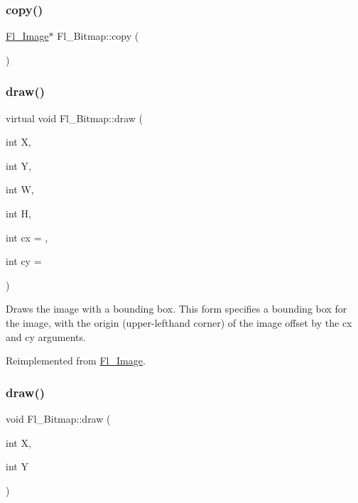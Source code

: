 \subsubsection{\texorpdfstring{copy()}{copy()}\hspace{0.1cm}{\footnotesize\ttfamily [2/2]}}
{\footnotesize\ttfamily \hyperlink{class_fl___image}{Fl\+\_\+\+Image}$\ast$ Fl\+\_\+\+Bitmap\+::copy (\begin{DoxyParamCaption}{ }\end{DoxyParamCaption})\hspace{0.3cm}{\ttfamily [inline]}}

\mbox{\label{class_fl___bitmap_abd03a34e84704ae410bd366626c0a6ef}} 
\subsubsection{\texorpdfstring{draw()}{draw()}\hspace{0.1cm}{\footnotesize\ttfamily [1/2]}}
{\footnotesize\ttfamily virtual void Fl\+\_\+\+Bitmap\+::draw (\begin{DoxyParamCaption}\item[{int}]{X,  }\item[{int}]{Y,  }\item[{int}]{W,  }\item[{int}]{H,  }\item[{int}]{cx = {},  }\item[{int}]{cy = {} }\end{DoxyParamCaption})\hspace{0.3cm}{\ttfamily [virtual]}}

Draws the image with a bounding box. This form specifies a bounding box for the image, with the origin (upper-\/lefthand corner) of the image offset by the cx and cy arguments. 

Reimplemented from \hyperlink{class_fl___image_a95e713f20628bfb4c8155ab94ba65ba1}{Fl\+\_\+\+Image}.

\mbox{\label{class_fl___bitmap_adbc4fad3bd0f24231c1b056d197a8172}} 
\subsubsection{\texorpdfstring{draw()}{draw()}\hspace{0.1cm}{\footnotesize\ttfamily [2/2]}}
{\footnotesize\ttfamily void Fl\+\_\+\+Bitmap\+::draw (\begin{DoxyParamCaption}\item[{int}]{X,  }\item[{int}]{Y }\end{DoxyParamCaption})\hspace{0.3cm}{\ttfamily [inline]}}

